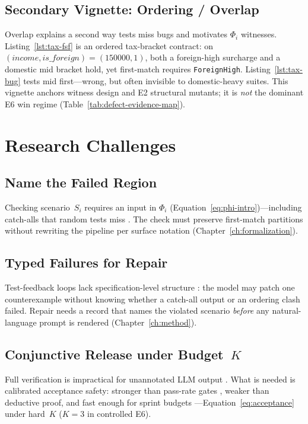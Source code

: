 \subsection{Secondary Vignette: Ordering / Overlap}
Overlap explains a second way tests miss bugs and motivates $\Phi_i$ witnesses.
Listing~\ref{lst:tax-fsf} is an ordered tax-bracket contract: on
$(\mathit{income},\mathit{is\_foreign})=(150000,1)$, both a foreign-high
surcharge and a domestic mid bracket hold, yet first-match requires
\texttt{ForeignHigh}.
Listing~\ref{lst:tax-bug} tests mid first---wrong, but often invisible to
domestic-heavy suites.
This vignette anchors witness design and E2 structural mutants; it is
\emph{not} the dominant E6 win regime
(Table~\ref{tab:defect-evidence-map}).



\section{Research Challenges}
\label{sec:intro:challenges}

\subsection{Name the Failed Region}
Checking scenario~$S_i$ requires an input in $\Phi_i$
(Equation~\eqref{eq:phi-intro})---including catch-alls that random tests miss
\cite{barrett2018smt}.
The check must preserve first-match partitions without rewriting the pipeline
per surface notation (Chapter~\ref{ch:formalization}).

\subsection{Typed Failures for Repair}
Test-feedback loops lack specification-level structure
\cite{sun2024clover}: the model may patch one counterexample without knowing
whether a catch-all output or an ordering clash failed.
Repair needs a record that names the violated scenario \emph{before} any
natural-language prompt is rendered (Chapter~\ref{ch:method}).

\subsection{Conjunctive Release under Budget~$K$}
Full verification is impractical for unannotated LLM output
\cite{leino2010dafny,loughridge2024dafnybench}.
What is needed is calibrated acceptance safety: stronger than pass-rate gates
\cite{chen2021codex}, weaker than deductive proof, and fast enough for sprint
budgets \citep{beck2004xp,li2022qrs_companion}---Equation~\eqref{eq:acceptance}
under hard~$K$ ($K{=}3$ in controlled E6).


